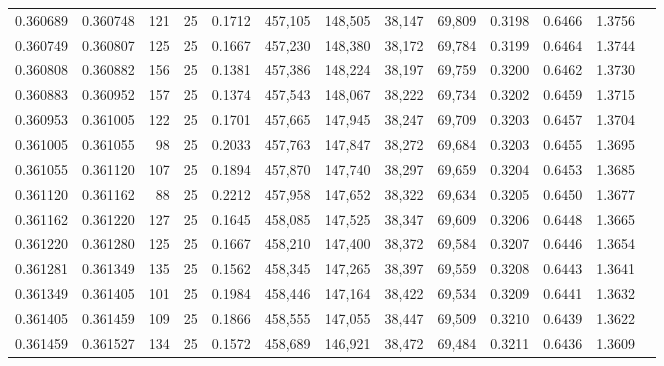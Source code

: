 \begin{tabular}{rrrrrrrrrrrrr}
0.360689 & 0.360748 &   121 &  25 &                                     0.1712 & 457,105 & 148,505 &  38,147 &  69,809 & 0.3198 & 0.6466 & 1.3756 \\
0.360749 & 0.360807 &   125 &  25 &                                     0.1667 & 457,230 & 148,380 &  38,172 &  69,784 & 0.3199 & 0.6464 & 1.3744 \\
0.360808 & 0.360882 &   156 &  25 &                                     0.1381 & 457,386 & 148,224 &  38,197 &  69,759 & 0.3200 & 0.6462 & 1.3730 \\
0.360883 & 0.360952 &   157 &  25 &                                     0.1374 & 457,543 & 148,067 &  38,222 &  69,734 & 0.3202 & 0.6459 & 1.3715 \\
0.360953 & 0.361005 &   122 &  25 &                                     0.1701 & 457,665 & 147,945 &  38,247 &  69,709 & 0.3203 & 0.6457 & 1.3704 \\
0.361005 & 0.361055 &    98 &  25 &                                     0.2033 & 457,763 & 147,847 &  38,272 &  69,684 & 0.3203 & 0.6455 & 1.3695 \\
0.361055 & 0.361120 &   107 &  25 &                                     0.1894 & 457,870 & 147,740 &  38,297 &  69,659 & 0.3204 & 0.6453 & 1.3685 \\
0.361120 & 0.361162 &    88 &  25 &                                     0.2212 & 457,958 & 147,652 &  38,322 &  69,634 & 0.3205 & 0.6450 & 1.3677 \\
0.361162 & 0.361220 &   127 &  25 &                                     0.1645 & 458,085 & 147,525 &  38,347 &  69,609 & 0.3206 & 0.6448 & 1.3665 \\
0.361220 & 0.361280 &   125 &  25 &                                     0.1667 & 458,210 & 147,400 &  38,372 &  69,584 & 0.3207 & 0.6446 & 1.3654 \\
0.361281 & 0.361349 &   135 &  25 &                                     0.1562 & 458,345 & 147,265 &  38,397 &  69,559 & 0.3208 & 0.6443 & 1.3641 \\
0.361349 & 0.361405 &   101 &  25 &                                     0.1984 & 458,446 & 147,164 &  38,422 &  69,534 & 0.3209 & 0.6441 & 1.3632 \\
0.361405 & 0.361459 &   109 &  25 &                                     0.1866 & 458,555 & 147,055 &  38,447 &  69,509 & 0.3210 & 0.6439 & 1.3622 \\
0.361459 & 0.361527 &   134 &  25 &                                     0.1572 & 458,689 & 146,921 &  38,472 &  69,484 & 0.3211 & 0.6436 & 1.3609 \\

\end{tabular}

